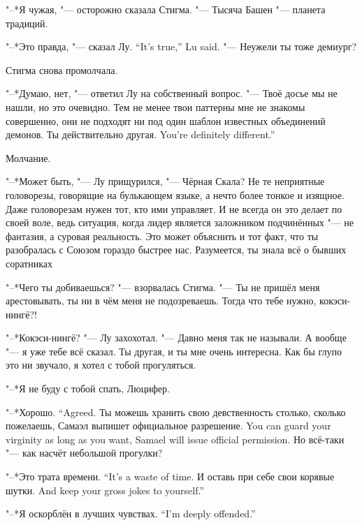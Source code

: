 "--*Я чужая, "--- осторожно сказала Стигма.
"--- Тысяча Башен "--- планета традиций.

{"--*Это правда, "--- сказал Лу.}
{``It's true,'' Lu said.}
"--- Неужели ты тоже демиург?

Стигма снова промолчала.

"--*Думаю, нет, "--- ответил Лу на собственный вопрос.
"--- Твоё досье мы не нашли, но это очевидно.
Тем не менее твои паттерны мне не знакомы совершенно, они не подходят ни под один шаблон известных объединений демонов.
{Ты действительно другая.}
{You're definitely different.''}

Молчание.

"--*Может быть, "--- Лу прищурился, "--- Чёрная Скала?
Не те неприятные головорезы, говорящие на булькающем языке, а нечто более тонкое и изящное.
Даже головорезам нужен тот, кто ими управляет.
И не всегда он это делает по своей воле, ведь ситуация, когда лидер является заложником подчинённых "--- не фантазия, а суровая реальность.
Это может объяснить и тот факт, что ты разобралась с Союзом гораздо быстрее нас.
Разумеется, ты знала всё о бывших соратниках\ldotst

"--*Чего ты добиваешься? "--- взорвалась Стигма.
"--- Ты не пришёл меня арестовывать, ты ни в чём меня не подозреваешь.
Тогда что тебе нужно, кокэси-нингё\footnotemark?!

"--*Кокэси-нингё? "--- Лу захохотал.
"--- Давно меня так не называли. 
А вообще "--- я уже тебе всё сказал.
Ты другая, и ты мне очень интересна.
Как бы глупо это ни звучало, я хотел с тобой прогуляться.

"--*Я не буду с тобой спать, Люцифер.

{"--*Хорошо.}
{``Agreed.}
{Ты можешь хранить свою девственность столько, сколько пожелаешь, Самаэл выпишет официальное разрешение.}
{You can guard your virginity as long as you want, Samael will issue official permission.}
Но всё-таки "--- как насчёт небольшой прогулки?

{"--*Это трата времени.}
{``It's a waste of time.}
{И оставь при себе свои корявые шутки.}
{And keep your gross jokes to yourself.''}

{"--*Я оскорблён в лучших чувствах.}
{``I'm deeply offended.''}

